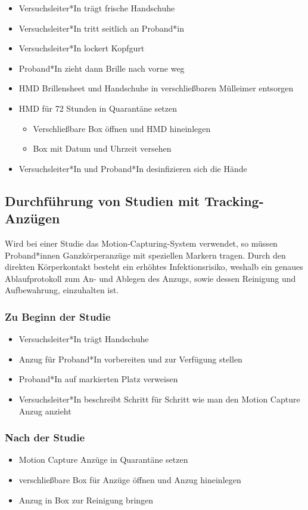 {
\singlespacing
\begin{itemize}
    \item Versuchsleiter*In trägt frische Handschuhe
    \item Versuchsleiter*In tritt seitlich an Proband*in
    \item Versuchsleiter*In lockert Kopfgurt
    \item Proband*In zieht dann Brille nach vorne weg
    \item HMD Brillensheet und Handschuhe in verschließbaren Mülleimer entsorgen
    \item HMD für 72 Stunden in Quarantäne setzen
    \begin{itemize}
        \item Verschließbare Box öffnen und HMD hineinlegen
        \item Box mit Datum und Uhrzeit versehen
    \end{itemize}
    \item Versuchsleiter*In und Proband*In desinfizieren sich die Hände
\end{itemize}
}

\subsection{Durchführung von Studien mit Tracking-Anzügen}\label{subsec:nutzerstudien_mocap}

Wird bei einer Studie das Motion-Capturing-System verwendet, so müssen Proband*innen Ganzkörperanzüge mit speziellen Markern tragen.
Durch den direkten Körperkontakt besteht ein erhöhtes Infektionsrisiko, weshalb ein genaues Ablaufprotokoll zum An- und Ablegen des Anzugs, sowie dessen Reinigung und Aufbewahrung, einzuhalten ist.

\subsubsection*{Zu Beginn der Studie}

{
\singlespacing
\begin{itemize}
    \item Versuchsleiter*In trägt Handschuhe
    \item Anzug für Proband*In vorbereiten und zur Verfügung stellen
    \item Proband*In auf markierten Platz verweisen 
    \item Versuchsleiter*In beschreibt Schritt für Schritt wie man den Motion Capture Anzug anzieht
\end{itemize}
}

\subsubsection*{Nach der Studie}

{
\singlespacing
\begin{itemize}
    \item Motion Capture Anzüge in Quarantäne setzen
    \item verschließbare Box für Anzüge öffnen und Anzug hineinlegen
    \item Anzug in Box zur Reinigung bringen
\end{itemize}
}
